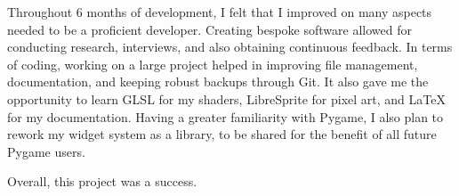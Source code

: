 \documentclass[../main/main.tex]{subfiles}
\begin{document}
Throughout 6 months of development, I felt that I improved on many aspects needed to be a proficient developer. Creating bespoke software allowed for conducting research, interviews, and also obtaining continuous feedback. In terms of coding, working on a large project helped in improving file management, documentation, and keeping robust backups through Git. It also gave me the opportunity to learn GLSL for my shaders, LibreSprite for pixel art, and LaTeX for my documentation. Having a greater familiarity with Pygame, I also plan to rework my widget system as a library, to be shared for the benefit of all future Pygame users.

Overall, this project was a success.
\end{document}
